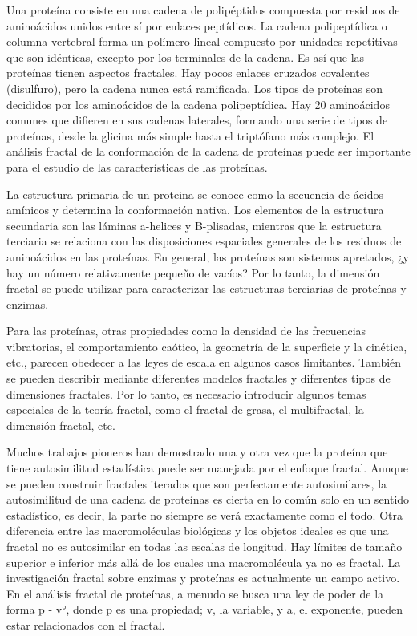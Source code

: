 \documentclass[11pt]{article}
\begin{document}
Una proteína consiste en una cadena de polipéptidos compuesta por residuos de aminoácidos unidos entre sí por enlaces peptídicos. La cadena polipeptídica o columna vertebral forma un polímero lineal compuesto por unidades repetitivas que son idénticas, excepto por los terminales de la cadena. Es así que las proteínas tienen aspectos fractales. Hay pocos enlaces cruzados covalentes (disulfuro), pero la cadena nunca está ramificada. Los tipos de proteínas son decididos por los aminoácidos de la cadena polipeptídica. Hay 20 aminoácidos comunes que difieren en sus cadenas laterales, formando una serie de tipos de proteínas, desde la glicina más simple hasta el triptófano más complejo. El análisis fractal de la conformación de la cadena de proteínas puede ser importante para el estudio de las características de las proteínas.

La estructura primaria de un proteina se conoce como la secuencia de ácidos amínicos y determina la conformación nativa. Los elementos de la estructura secundaria son las láminas a-helices y B-plisadas, mientras que la estructura terciaria se relaciona con las disposiciones espaciales generales de los residuos de aminoácidos en las proteínas. En general, las proteínas son sistemas apretados, ¿y hay un número relativamente pequeño de vacíos? Por lo tanto, la dimensión fractal se puede utilizar para caracterizar las estructuras terciarias de proteínas y enzimas.

Para las proteínas, otras propiedades como la densidad de las frecuencias vibratorias, el comportamiento caótico, la geometría de la superficie y la cinética, etc., parecen obedecer a las leyes de escala en algunos casos limitantes. También se pueden describir mediante diferentes modelos fractales y diferentes tipos de dimensiones fractales. Por lo tanto, es necesario introducir algunos temas especiales de la teoría fractal, como el fractal de grasa, el multifractal, la dimensión fractal, etc.

Muchos trabajos pioneros han demostrado una y otra vez que la proteína que tiene autosimilitud estadística puede ser manejada por el enfoque fractal. Aunque se pueden construir fractales iterados que son perfectamente autosimilares, la autosimilitud de una cadena de proteínas es cierta en lo común solo en un sentido estadístico, es decir, la parte no siempre se verá exactamente como el todo. Otra diferencia entre las macromoléculas biológicas y los objetos ideales es que una fractal no es autosimilar en todas las escalas de longitud. Hay límites de tamaño superior e inferior más allá de los cuales una macromolécula ya no es fractal. La investigación fractal sobre enzimas y proteínas es actualmente un campo activo. En el análisis fractal de proteínas, a menudo se busca una ley de poder de la forma p - v°, donde p es una propiedad; v, la variable, y a, el exponente, pueden estar relacionados con el fractal.
\end{document}
